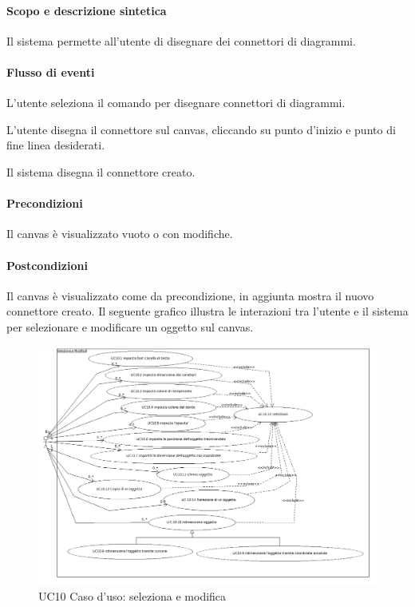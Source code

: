 \paragraph{Scopo e descrizione sintetica} 
Il sistema permette all'utente di disegnare dei connettori di diagrammi.
\paragraph{Flusso di eventi}
\begin{elenconumerato}[\textbf{}]{\subsubsecindent}
\item L'utente seleziona il comando per disegnare connettori di diagrammi.
\item L'utente disegna il connettore sul canvas, cliccando su punto d'inizio e punto di fine linea desiderati.
\item Il sistema disegna il connettore creato.
\end{elenconumerato}
\paragraph{Precondizioni} Il canvas \`e visualizzato vuoto o con modifiche.
\paragraph{Postcondizioni} Il canvas \`e visualizzato come da precondizione, in aggiunta mostra il nuovo connettore creato.
\newpage
{}
\label{ucselezionaemodifica}
Il seguente grafico illustra le interazioni tra l'utente e il sistema per selezionare e modificare un oggetto sul canvas.

\begin{figure}[!ht]
\centering
\vspace{20pt} 
\includegraphics[scale=0.4]{UC10Espanso.png}
\caption{UC10 Caso d'uso: seleziona e modifica}
\label{uc10}
\end{figure}
\newpage
{}

